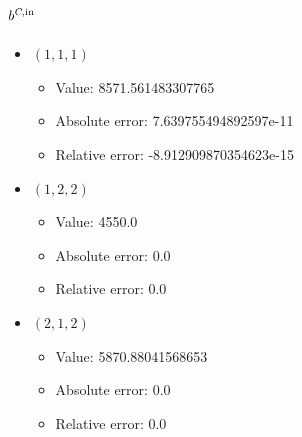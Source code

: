 \documentclass{article}%
\begin{document}
\subsection{$b^{\textsl{C},\text{in}}$}%
\begin{itemize}%
	\item $(1, 1, 1)$%
	\begin{itemize}%
		\item Value: 8571.561483307765%
		\item Absolute error: 7.639755494892597e-11%
		\item Relative error: -8.912909870354623e-15%
	\end{itemize}%
	\item $(1, 2, 2)$%
	\begin{itemize}%
		\item Value: 4550.0%
		\item Absolute error: 0.0%
		\item Relative error: 0.0%
	\end{itemize}%
	\item $(2, 1, 2)$%
	\begin{itemize}%
		\item Value: 5870.88041568653%
		\item Absolute error: 0.0%
		\item Relative error: 0.0%
	\end{itemize}%
\end{itemize}%
\end{document}
